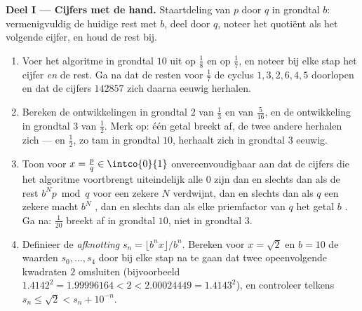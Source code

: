 \begin{problem}
\medskip
\noindent\textbf{Deel I --- Cijfers met de hand.} Staartdeling van $p$
door $q$ in grondtal $b$: vermenigvuldig de huidige rest met $b$, deel
door $q$, noteer het quotiënt als het volgende cijfer, en houd de rest
bij.
\begin{enumerate}
  \item Voer het algoritme in grondtal $10$ uit op $\frac 18$ en op
        $\frac 17$, en noteer bij elke stap het cijfer \emph{en} de
        rest. Ga na dat de resten voor $\frac 17$ de cyclus $1, 3, 2, 6,
        4, 5$ doorlopen en dat de cijfers $142857$ zich daarna eeuwig
        herhalen.
  \item Bereken de ontwikkelingen in grondtal $2$ van $\frac 13$ en van
        $\frac{5}{16}$, en de ontwikkeling in grondtal $3$ van $\frac
        12$. Merk op: één getal breekt af, de twee andere herhalen zich
        --- en $\frac 12$, zo tam in grondtal $10$, herhaalt zich in
        grondtal $3$ eeuwig.
  \item Toon voor $x = \frac pq \in \intco{0}{1}$ onvereenvoudigbaar aan
        dat de cijfers die het algoritme voortbrengt uiteindelijk alle
        $0$ zijn dan en slechts dan als de rest $b^N p \bmod q$ voor een
        zekere $N$ verdwijnt, dan en slechts dan als $q$ een zekere
        macht $b^N$ , dan en slechts dan als elke priemfactor van
        $q$ het getal $b$ . Ga na: $\frac{1}{20}$ breekt af in
        grondtal $10$, niet in grondtal $3$.
  \item Definieer de \emph{afknotting} $s_n = \lfloor b^n x \rfloor /
        b^n$. Bereken voor $x = \sqrt 2$ en $b = 10$ de waarden $s_0,
        \dots, s_4$ door bij elke stap na te gaan dat twee opeenvolgende
        kwadraten $2$ omsluiten (bijvoorbeeld $1.4142^2 = 1.99996164 < 2
        < 2.00024449 = 1.4143^2$), en controleer telkens $s_n \leq \sqrt
        2 < s_n + 10^{-n}$.
\end{enumerate}


\end{problem}

